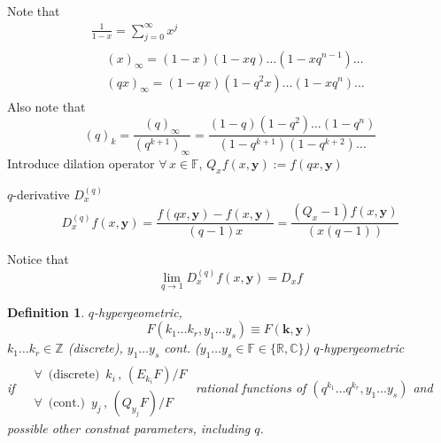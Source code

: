 \documentclass[10pt]{amsart}
\newtheorem{definition}{Definition}
\begin{document}
\begin{multicols*}{2}
Note that 
\[
\begin{gathered}
  \frac{1}{1-x} = \sum_{j=0}^{\infty}x^j \\ 
  \begin{aligned}
    & (x)_{\infty} = (1-x)(1-xq) \dots (1-xq^{n-1}) \dots \\ 
    & (qx)_{\infty} = (1-qx)(1-q^2x)\dots (1-xq^n) \dots
\end{aligned}
\end{gathered}
\]
Also note that 
\[
(q)_k  =\frac{ (q)_{\infty} }{ (q^{k+1})_{\infty}} = \frac{(1-q)(1-q^2) \dots (1-q^n) }{ (1-q^{k+1})(1-q^{k+2})\dots }
\]
Introduce dilation operator $\forall \, x \in \mathbb{F}$, $Q_xf(x,\mathbf{y}) := f(qx,\mathbf{y})$

$q$-derivative $D_x^{(q)}$
\[
D_x^{(q)}f(x,\mathbf{y}) = \frac{f(qx,\mathbf{y}) - f(x,\mathbf{y}) }{(q-1)x} = \frac{(Q_x -1)f(x,\mathbf{y})}{(x(q-1) ) }
\]

Notice that 
\[
\lim_{q\to 1} D^{(q)}_xf(x,\mathbf{y}) = D_x f
\]

\begin{definition}
  $q$-hypergeometric,
\[
F(k_1 \dots k_r, y_1 \dots y_s) \equiv F(\mathbf{k},\mathbf{y})
\]
$k_1 \dots k_r \in \mathbb{Z}$ (discrete), $y_1 \dots y_s$ cont. ($y_1 \dots y_s \in \mathbb{F} \in \lbrace \mathbb{R}, \mathbb{C} \rbrace$) \emph{$q$-hypergeometric} \\

if $\begin{aligned} & \quad \\ 
  & \forall \,  \text{ (discrete) } \, k_i \, , \, (E_{k_i}F)/F \\ 
  & \forall \, \text{ (cont.) } \, y_j \, , \, (Q_{y_j}F)/F \end{aligned}$ rational functions of $(q^{k_1} \dots q^{k_r}, y_1 \dots y_s)$ and possible other constnat parameters, including $q$.  
\end{definition}


\end{multicols*}
\end{document}
